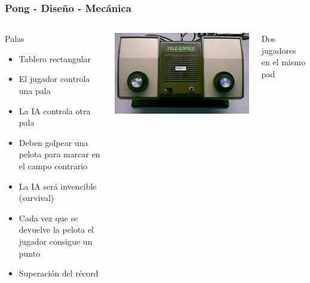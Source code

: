 \begin{frame}
	\frametitle{Pong - Diseño - Mecánica}
	
	\begin{columns}[c]
	\column{175pt}	
	
	\begin{block}{Palas}
		\begin{itemize}
			\item Tablero rectangular
			\item El jugador controla una pala
			\item La IA controla otra pala
			\item Deben golpear una pelota para marcar en el campo contrario
			\item La IA será invencible (survival)
			\item Cada vez que se devuelve la pelota el jugador consigue un punto
			\item Superación del récord
		\end{itemize}            
	\end{block}
	
	\column{125pt}
	
	\begin{center}
		\includegraphics[scale=0.45]{img/telepong.jpg}
	\end{center}
	
	\begin{center}
	    Dos jugadores en el mismo pad
	\end{center}	
	
	\end{columns}
	
\end{frame}

